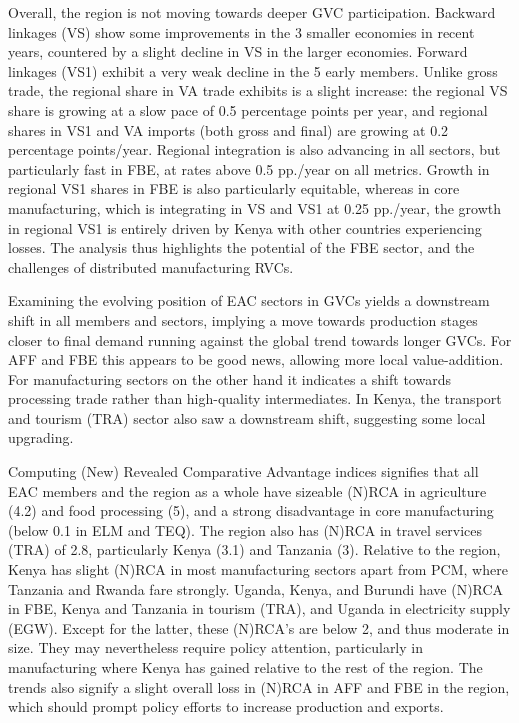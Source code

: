 \documentclass[a4paper]{article}
\begin{document}
Overall, the region is not moving towards deeper GVC participation. Backward linkages (VS) show some improvements in the 3 smaller economies in recent years, countered by a slight decline in VS in the larger economies. Forward linkages (VS1) exhibit a very weak decline in the 5 early members. Unlike gross trade, the regional share in VA trade exhibits is a slight increase: the regional VS share is growing at a slow pace of 0.5 percentage points per year, and regional shares in VS1 and VA imports (both gross and final) are growing at 0.2 percentage points/year. Regional integration is also advancing in all sectors, but particularly fast in FBE, at rates above 0.5 pp./year on all metrics. Growth in regional VS1 shares in FBE is also particularly equitable, whereas in core manufacturing, which is integrating in VS and VS1 at 0.25 pp./year, the growth in regional VS1 is entirely driven by Kenya with other countries experiencing losses. The analysis thus highlights the potential of the FBE sector, and the challenges of distributed manufacturing RVCs. \newline

Examining the evolving position of EAC sectors in GVCs yields a downstream shift in all members and sectors, implying a move towards production stages closer to final demand running against the global trend towards longer GVCs. For AFF and FBE this appears to be good news, allowing more local value-addition. For manufacturing sectors on the other hand it indicates a shift towards processing trade rather than high-quality intermediates. In Kenya, the transport and tourism (TRA) sector also saw a downstream shift, suggesting some local upgrading. \newline

Computing (New) Revealed Comparative Advantage indices signifies that all EAC members and the region as a whole have sizeable (N)RCA in agriculture (4.2) and food processing (5), and a strong disadvantage in core manufacturing (below 0.1 in ELM and TEQ). The region also has (N)RCA in travel services (TRA) of 2.8, particularly Kenya (3.1) and Tanzania (3). Relative to the region, Kenya has slight (N)RCA in most manufacturing sectors apart from PCM, where Tanzania and Rwanda fare strongly. Uganda, Kenya, and Burundi have (N)RCA in FBE, Kenya and Tanzania in tourism (TRA), and Uganda in electricity supply (EGW). Except for the latter, these (N)RCA's are below 2, and thus moderate in size. They may nevertheless require policy attention, particularly in manufacturing where Kenya has gained relative to the rest of the region. The trends also signify a slight overall loss in (N)RCA in AFF and FBE in the region, which should prompt policy efforts to increase production and exports. \newline
\end{document}
